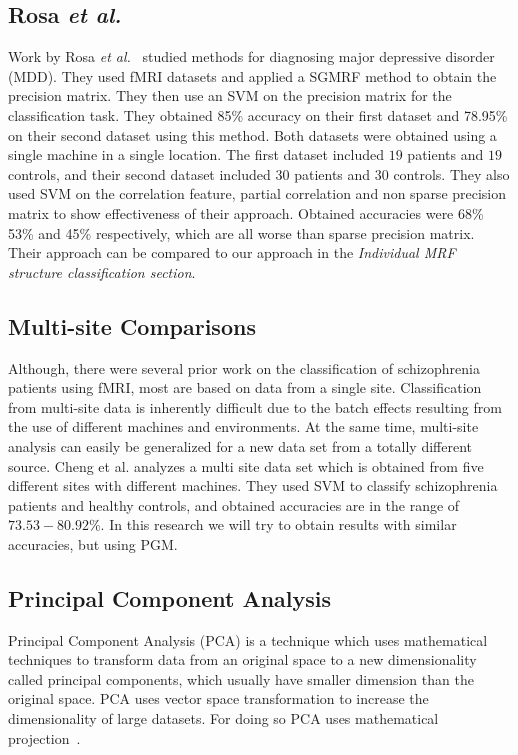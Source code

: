 \documentclass{article} %
\begin{document}
\subsection{Rosa \emph{et al.}}
Work by Rosa \emph{et al.}~\cite{Rosa_2013} studied methods for diagnosing major 
depressive disorder (MDD). They used fMRI datasets and 
applied a SGMRF method to obtain the precision matrix. They then
use an SVM on the precision matrix for the classification task. 
They obtained 85\% accuracy on their first dataset and 78.95\% on their 
second dataset using this method. Both datasets were obtained using a single 
machine in a single location. The first dataset included $19$ patients 
and $19$ controls, and their second dataset included $30$ 
patients and $30$ controls. They also used SVM on the correlation feature, 
partial correlation and non sparse precision matrix to show effectiveness of 
their approach. Obtained accuracies were 68\% 53\% and 45\% respectively, 
which are all worse than sparse precision matrix. Their 
approach can be compared to our approach in the \textit{Individual MRF 
structure classification section}.       

\subsection{Multi-site Comparisons}
Although, there were several prior work on the classification of schizophrenia 
patients using fMRI, most are based on data from a single site. 
Classification from multi-site data is inherently difficult due to the batch 
effects resulting from the use of different machines and environments. At the 
same time, multi-site analysis can easily be generalized for a new data set 
from a totally different source. Cheng et al. \cite{Cheng2015} analyzes a 
multi site data set which is obtained from five different sites with different 
machines. They used SVM to classify schizophrenia patients and healthy 
controls, and obtained accuracies are in the range of $73.53- 80.92\%$. In this 
research we will try to obtain results with similar accuracies, but using PGM.


\subsection{Principal Component Analysis}
Principal Component Analysis (PCA) is a technique which uses 
mathematical techniques to transform data from an original space 
to a new dimensionality called principal components, which usually have 
smaller dimension than the original space. PCA uses vector 
space transformation to increase the dimensionality of large datasets. For 
doing so PCA uses mathematical projection~\cite{richardson2009principal}.
\end{document}
